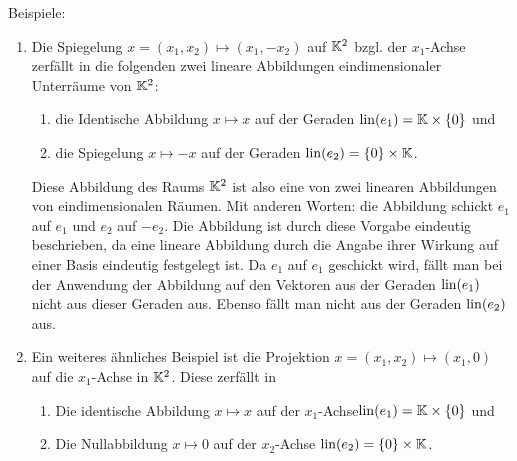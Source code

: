 Beispiele:
\begin{enumerate}
	\item
		Die Spiegelung $ x = (x_1,x_2) \mapsto (x_1, -x_2) $ auf $ \mathbb K^2 $ bzgl. der $x_1$-Achse zerfällt in die folgenden zwei lineare Abbildungen eindimensionaler Unterräume von $\mathbb K^2$: 
		
		\begin{center}
		\end{center} 
	
		\begin{enumerate}
			\item die Identische Abbildung $ x \mapsto x $ auf der Geraden $ \operatorname{lin}(e_1) =\mathbb K \times \{ 0 \} $ und
			\item die Spiegelung $ x \mapsto -x $ auf der Geraden $ \operatorname{lin}(e_2) = \{ 0 \} \times \mathbb K $.
		\end{enumerate}
		
		Diese Abbildung des Raums $\mathbb K^2$ ist also eine  von zwei linearen Abbildungen von eindimensionalen Räumen. Mit anderen Worten: die Abbildung schickt $e_1$ auf $e_1$ und $e_2$ auf $-e_2$. Die Abbildung ist durch diese Vorgabe eindeutig beschrieben, da eine lineare Abbildung durch die Angabe ihrer Wirkung auf einer Basis eindeutig festgelegt ist. Da $e_1$ auf $e_1$ geschickt wird, fällt man bei der Anwendung der Abbildung auf den Vektoren aus der Geraden $\operatorname{lin}(e_1)$ nicht aus dieser Geraden aus. Ebenso fällt man nicht aus der Geraden $\operatorname{lin}(e_2)$ aus. 
	\item
		Ein weiteres ähnliches Beispiel ist die Projektion $ x = (x_1,x_2) \mapsto (x_1,0) $ auf die $x_1$-Achse in $ \mathbb K^2 $. Diese zerfällt in 
		\begin{enumerate}
			\item Die identische Abbildung $ x \mapsto x $ auf der $x_1$-Achse$ \operatorname{lin}(e_1)= \mathbb K \times \{ 0 \} $ und
			\item Die Nullabbildung $ x \mapsto 0 $ auf der $x_2$-Achse $\operatorname{lin}(e_2)= \{ 0 \} \times \mathbb K $.
		\end{enumerate}
			\begin{center}
	\end{center} 
	

\end{enumerate}
